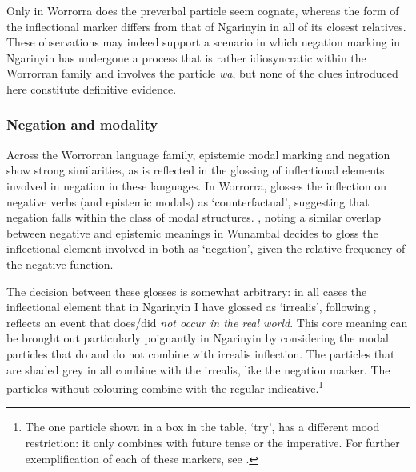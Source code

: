 \documentclass[output=paper,colorlinks,citecolor=brown]{langscibook}
\begin{document}
Only in Worrorra does the preverbal particle seem cognate, whereas the form of the inflectional marker differs from that of Ngarinyin in all of its closest relatives. These observations may indeed support a scenario in which negation marking in Ngarinyin has undergone a process that is rather idiosyncratic within the Worrorran family and involves the particle \textit{wa}, but none of the clues introduced here constitute definitive evidence.

\subsubsection{Negation and modality} \label{subsModality}
Across the Worrorran language family, epistemic modal marking and negation show strong similarities, as is reflected in the glossing of inflectional elements involved in negation in these languages. In Worrorra, \citet{Clendon2014} glosses the inflection on negative verbs (and epistemic modals) as `counterfactual', suggesting that negation falls within the class of modal structures. \citet{Carr2000}, noting a similar overlap between negative and epistemic meanings in Wunambal decides to gloss the inflectional element involved in both as `negation', given the relative frequency of the negative function.

The decision between these glosses is somewhat arbitrary: in all cases the inflectional element that in Ngarinyin I have glossed as `irrealis', following \citet{Rumsey1982}, reflects an event that does/did \textit{not occur in the real world}. This core meaning can be brought out particularly poignantly in Ngarinyin by considering the modal particles that do and do not combine with irrealis inflection. The particles that are shaded \colorbox{light-gray}{grey} in  all combine with the irrealis, like the negation marker. The particles without colouring combine with the regular indicative.\footnote{The one particle shown in a box in the table,  `try', has a different mood restriction: it only combines with future tense or the imperative. For further exemplification of each of these markers, see \citet{Spronck2015}.}
\end{document}
